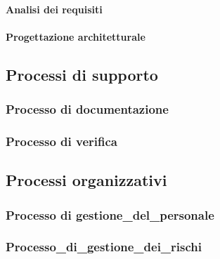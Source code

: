 \documentclass[../piano-di-qualifica.tex]{subfiles}
\begin{document}
\paragraph{Analisi dei requisiti}%
\label{par:analisi_dei_requisiti}

\paragraph{Progettazione architetturale}%
\label{par:progettazione_architetturale}

\subsection{Processi di supporto}%
\label{sub:processi_di_supporto}

\subsubsection{Processo di documentazione}%
\label{subs:processo_di_documentazione}

\subsubsection{Processo di verifica}%
\label{subs:processo_di_verifica}

\subsection{Processi organizzativi}%
\label{sub:processi_organizzativi}

\subsubsection{Processo di gestione_del_personale}%
\label{processo_di_gestione_del_personale}

\subsubsection{Processo_di_gestione_dei_rischi}%
\label{processo_di_gestione_dei_rischi}


\end{document}

